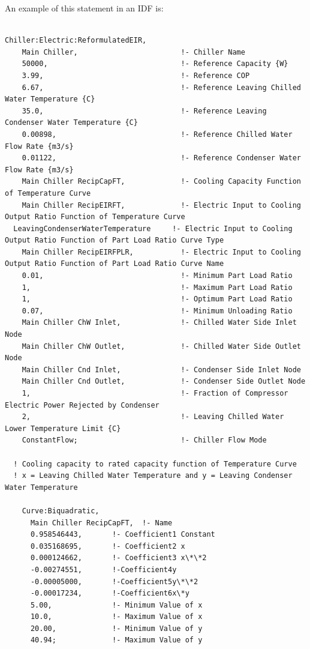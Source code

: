 An example of this statement in an IDF is:

\begin{lstlisting}

Chiller:Electric:ReformulatedEIR,
    Main Chiller,                        !- Chiller Name
    50000,                               !- Reference Capacity {W}
    3.99,                                !- Reference COP
    6.67,                                !- Reference Leaving Chilled Water Temperature {C}
    35.0,                                !- Reference Leaving Condenser Water Temperature {C}
    0.00898,                             !- Reference Chilled Water Flow Rate {m3/s}
    0.01122,                             !- Reference Condenser Water Flow Rate {m3/s}
    Main Chiller RecipCapFT,             !- Cooling Capacity Function of Temperature Curve
    Main Chiller RecipEIRFT,             !- Electric Input to Cooling Output Ratio Function of Temperature Curve
  LeavingCondenserWaterTemperature     !- Electric Input to Cooling Output Ratio Function of Part Load Ratio Curve Type
    Main Chiller RecipEIRFPLR,           !- Electric Input to Cooling Output Ratio Function of Part Load Ratio Curve Name
    0.01,                                !- Minimum Part Load Ratio
    1,                                   !- Maximum Part Load Ratio
    1,                                   !- Optimum Part Load Ratio
    0.07,                                !- Minimum Unloading Ratio
    Main Chiller ChW Inlet,              !- Chilled Water Side Inlet Node
    Main Chiller ChW Outlet,             !- Chilled Water Side Outlet Node
    Main Chiller Cnd Inlet,              !- Condenser Side Inlet Node
    Main Chiller Cnd Outlet,             !- Condenser Side Outlet Node
    1,                                   !- Fraction of Compressor Electric Power Rejected by Condenser
    2,                                   !- Leaving Chilled Water Lower Temperature Limit {C}
    ConstantFlow;                        !- Chiller Flow Mode

  ! Cooling capacity to rated capacity function of Temperature Curve
  ! x = Leaving Chilled Water Temperature and y = Leaving Condenser Water Temperature

    Curve:Biquadratic,
      Main Chiller RecipCapFT,  !- Name
      0.958546443,       !- Coefficient1 Constant
      0.035168695,       !- Coefficient2 x
      0.000124662,       !- Coefficient3 x\*\*2
      -0.00274551,       !-Coefficient4y
      -0.00005000,       !-Coefficient5y\*\*2
      -0.00017234,       !-Coefficient6x\*y
      5.00,              !- Minimum Value of x
      10.0,              !- Maximum Value of x
      20.00,             !- Minimum Value of y
      40.94;             !- Maximum Value of y


\end{lstlisting}

